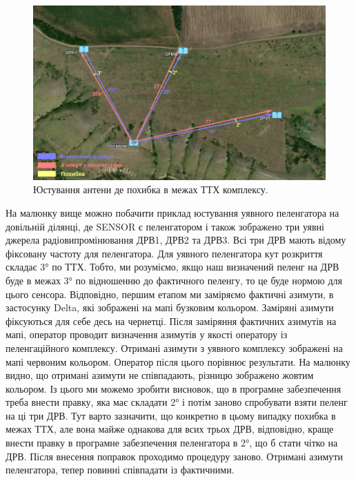 \documentclass{article}
\begin{document}
\begin{figure}[H]
	\centering
	\includegraphics[width=0.9\linewidth]{images/adjustments_ideal.png}
	\caption{\label{fig:tsi} Юстування антени де похибка в межах ТТХ комплексу.}
\end{figure}

На малюнку вище можно побачити приклад юстування уявного пеленгатора на довільній ділянці, де SENSOR є пеленгатором і також зображено три уявні джерела радіовипромінювання ДРВ1, ДРВ2 та ДРВ3. Всі три ДРВ мають відому фіксовану частоту для пеленгатора. Для уявного пеленгатора кут розкриття складає 3° по ТТХ. Тобто, ми розуміємо, якщо наш визначений пеленг на ДРВ буде в межах 3° по відношенню до фактичного пеленгу, то це буде нормою для цього сенсора. Відповідно, першим етапом ми заміряємо фактичні азимути, в застосунку Delta, які зображені на мапі бузковим кольором. Заміряні азимути фіксуються для себе десь на чернетці. Після заміряння фактичних азимутів на мапі, оператор проводит визначення азимутів у якості оператору із пеленгаційного комплексу. Отримані азимути з уявного комплексу зображені на мапі червоним кольором. Оператор після цього порівнює результати. На малюнку видно, що отримані азимути не співпадають, різницю зображено жовтим кольором. Із цього ми можемо зробити висновок, що в програмне забезпечення треба внести правку, яка має складати 2° і потім заново спробувати взяти пеленг на ці три ДРВ. Тут варто зазначити, що конкретно в цьому випадку похибка в межах ТТХ, але вона майже однакова для всих трьох ДРВ, відповідно, краще внести правку в програмне забезпечення пеленгатора в 2°, що б стати чітко на ДРВ. Після внесення поправок проходимо процедуру заново. Отримані азимути пеленгатора, тепер повинні співпадати із фактичними.
\end{document}
